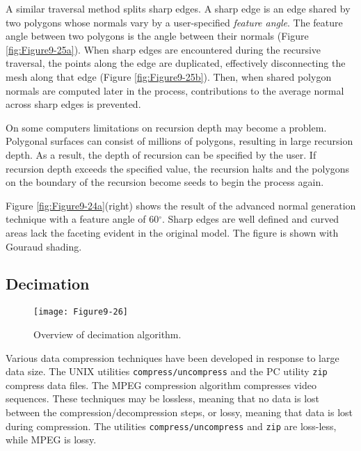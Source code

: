 A similar traversal method splits sharp edges. A sharp edge is an edge shared by two polygons whose normals vary by a user-specified \emph{feature angle}. The feature angle between two polygons is the angle between their normals (Figure \ref{fig:Figure9-25a}). When sharp edges are encountered during the recursive traversal, the points along the edge are duplicated, effectively disconnecting the mesh along that edge (Figure \ref{fig:Figure9-25b}). Then, when shared polygon normals are computed later in the process, contributions to the average normal across sharp edges is prevented.

On some computers limitations on recursion depth may become a problem. Polygonal surfaces can consist of millions of polygons, resulting in large recursion depth. As a result, the depth of recursion can be specified by the user. If recursion depth exceeds the specified value, the recursion halts and the polygons on the boundary of the recursion become seeds to begin the process again.

Figure \ref{fig:Figure9-24a}(right) shows the result of the advanced normal generation technique with a feature angle of 60$^\circ$. Sharp edges are well defined and curved areas lack the faceting evident in the original model. The figure is shown with Gouraud shading.

\subsection{Decimation}

\begin{figure}[!htb]
	\centering
	\texttt{[image: Figure9-26]}
	\caption{Overview of decimation algorithm.}
	\label{fig:Figure9-26}
\end{figure}

Various data compression techniques have been developed in response to large data size. The UNIX utilities \texttt{compress/uncompress} and the PC utility \texttt{zip} compress data files. The MPEG compression algorithm compresses video sequences. These techniques may be lossless, meaning that no data is lost between the compression/decompression steps, or lossy, meaning that data is lost during compression. The utilities \texttt{compress/uncompress} and \texttt{zip} are loss-less, while MPEG is lossy.

